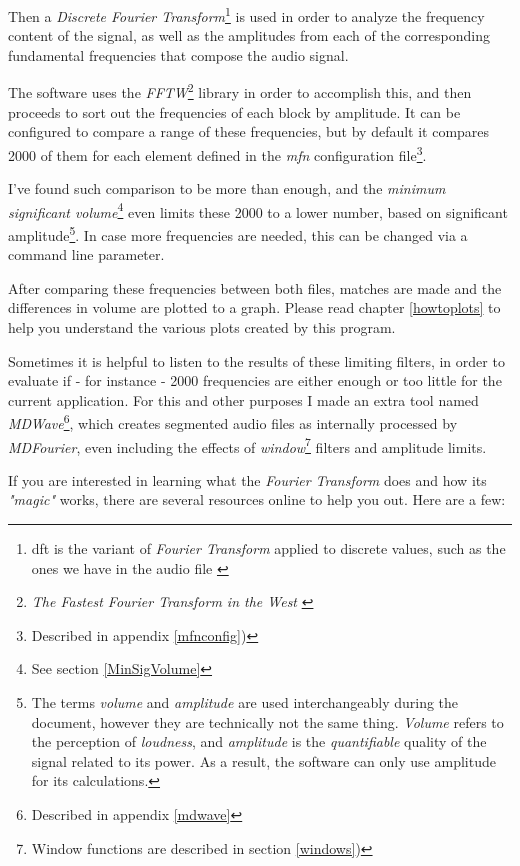 \documentclass[10pt,a4paper]{report}
\begin{document}
Then a \textit{Discrete Fourier Transform}\footnote{\gls{dft} is the variant of \textit{Fourier Transform} applied to discrete values, such as the ones we have in the audio file \cite{FourierTransformApps}} is used in order to analyze the frequency content of the signal, as well as the amplitudes from each of the corresponding fundamental frequencies that compose the audio signal.

The software uses the \textit{FFTW}\footnote{\textit{The Fastest Fourier Transform in the West} \cite{fftw}} library in order to accomplish this, and then proceeds to sort out the frequencies of each block by amplitude. It can be configured to compare a range of these frequencies, but by default it compares 2000 of them for each element defined in the \textit{mfn} configuration file\footnote{Described in appendix \ref{mfnconfig})}.

I've found such comparison to be more than enough, and the \textit{minimum significant volume}\footnote{See section \ref{MinSigVolume}} even limits these 2000 to a lower number, based on significant amplitude\footnote{The terms \textit{volume} and \textit{amplitude} are used interchangeably during the document, however they are technically not the same thing. \textit{Volume} refers to the perception of \textit{loudness}, and \textit{amplitude} is the \textit{quantifiable} quality of the signal related to its power. As a result, the software can only use amplitude for its calculations.}. In case more frequencies are needed, this can be changed via a command line parameter.

After comparing these frequencies between both files, matches are made and the differences in volume are plotted to a graph. Please read chapter \ref{howtoplots} to help you understand the various plots created by this program.

Sometimes it is helpful to listen to the results of these limiting filters, in order to evaluate if - for instance - 2000 frequencies are either enough or too little for the current application. For this and other purposes I made an extra tool named \textit{MDWave}\footnote{Described in appendix \ref{mdwave}}, which creates segmented audio files as internally processed by \textit{MDFourier}, even including the effects of \textit{window}\footnote{Window functions are described in section \ref{windows})} filters and amplitude limits.

If you are interested in learning what the \textit{Fourier Transform} does and how its \textit{"magic"} works, there are several resources online to help you out. Here are a few:
\end{document}
